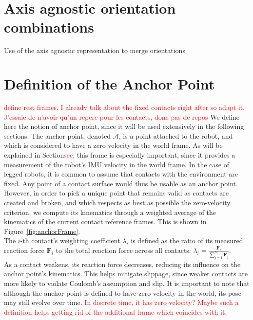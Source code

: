 \documentclass{IJCAS}
\begin{document}
\section{Axis agnostic orientation combinations}
Use of the axis agnostic representation to merge orientations

\section{Definition of the Anchor Point}
\textcolor{red}{define rest frames. I already talk about the fixed contacts right after so adapt it.}
\textcolor{red}{J'essaie de n'avoir qu'un repere pour les contacts, donc pas de repos}
We define here the notion of anchor point, since it will be used extensively in the following sections. The anchor point, denoted $\mathcal{A}$, is a point attached to the robot, and which is considered to have a zero velocity in the world frame. As will be explained in Section\textcolor{red}{sec}, this frame is especially important, since it provides a measurement of the robot's IMU velocity in the world frame. In the case of legged robots, it is common to assume that contacts with the environment are fixed. Any point of a contact surface would thus be usable as an anchor point. However, in order to pick a unique point that remains valid as contacts are created and broken, and which respects as best as possible the zero-velocity criterion, we compute its kinematics through a weighted average of the kinematics of the current contact reference frames. This is shown in Figure~\ref{fig:anchorFrame}. \\
The $i$-th contact's weighting coefficient $\lambda_{i}$ is defined as the ratio of its measured reaction force $\boldsymbol{F}_{i}$ to the total reaction force across all contacts: $\lambda_{i}=\frac{\boldsymbol{F}_{i}}{\sum^{n_{c}}_{j=1}\boldsymbol{F}_{j}}$. \\ 
As a contact weakens, its reaction force decreases, reducing its influence on the anchor point's kinematics. This helps mitigate slippage, since weaker contacts are more likely to violate Coulomb's assumption and slip. It is important to note that although the anchor point is defined to have zero velocity in the world, its pose may still evolve over time. \textcolor{red}{In discrete time, it has zero velocity? Maybe such a definition helps getting rid of the additional frame which coincides with it.}
\end{document}
